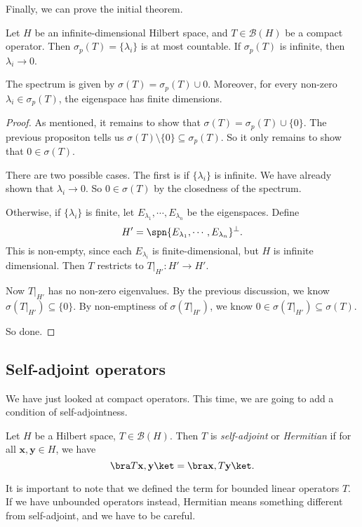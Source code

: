 \documentclass[a4paper]{article}
\begin{document}
Finally, we can prove the initial theorem.
\begin{thm}
  Let $H$ be an infinite-dimensional Hilbert space, and $T \in \mathcal{B}(H)$ be a compact operator. Then $\sigma_p(T) = \{\lambda_i\}$ is at most countable. If $\sigma_p(T)$ is infinite, then $\lambda_i \to 0$.

  The spectrum is given by $\sigma(T) = \sigma_p(T) \cup 0$. Moreover, for every non-zero $\lambda_i \in \sigma_p (T)$, the eigenspace has finite dimensions.
\end{thm}

\begin{proof}
  As mentioned, it remains to show that $\sigma(T) = \sigma_p(T) \cup \{0\}$. The previous propositon tells us $\sigma(T) \setminus \{0\} \subseteq \sigma_p(T)$. So it only remains to show that $0 \in \sigma(T)$.

  There are two possible cases. The first is if $\{\lambda_i\}$ is infinite. We have already shown that $\lambda_i \to 0$. So $0 \in \sigma(T)$ by the closedness of the spectrum.

  Otherwise, if $\{\lambda_i\}$ is finite, let $E_{\lambda_1}, \cdots, E_{\lambda_n}$ be the eigenspaces. Define
  \[
    H' = \spn\{E_{\lambda_1}, \cdots, E_{\lambda_n}\}^\perp.
  \]
  This is non-empty, since each $E_{\lambda_i}$ is finite-dimensional, but $H$ is infinite dimensional. Then $T$ restricts to $T|_{H'}: H' \to H'$.

  Now $T|_{H'}$ has no non-zero eigenvalues. By the previous discussion, we know $\sigma(T|_{H'}) \subseteq \{0\}$. By non-emptiness of $\sigma(T|_{H'})$, we know $0 \in \sigma(T|_{H'}) \subseteq \sigma(T)$.

  So done.
\end{proof}

\subsection{Self-adjoint operators}
We have just looked at compact operators. This time, we are going to add a condition of self-adjointness.

\begin{defi}
  Let $H$ be a Hilbert space, $T \in \mathcal{B}(H)$. Then $T$ is \emph{self-adjoint} or \emph{Hermitian} if for all $\mathbf{x}, \mathbf{y} \in H$, we have
  \[
    \bra T \mathbf{x}, \mathbf{y}\ket = \bra \mathbf{x}, T \mathbf{y}\ket.
  \]
\end{defi}
It is important to note that we defined the term for bounded linear operators $T$. If we have unbounded operators instead, Hermitian means something different from self-adjoint, and we have to be careful.
\end{document}
